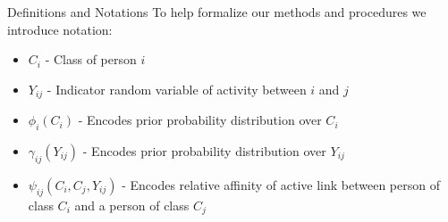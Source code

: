 \message{ !name(poster.tex)}\documentclass[final,t]{beamer}
\begin{document}
\begin{frame}{}
\begin{columns}[t]
\begin{column}{.3\linewidth}
\begin{block}{Definitions and Notations}
        To help formalize our methods and procedures we introduce
        notation: \break
        \begin{itemize}
        \item $C_i$ - Class of person $i$
        \item $Y_{ij}$ - Indicator random variable of activity between $i$ and $j$
        \item $\phi_i(C_i)$ - Encodes prior probability distribution over $C_i$
        \item $\gamma_{ij}(Y_{ij})$ - Encodes prior probability
          distribution over $Y_{ij}$
        \item $\psi_{ij}(C_i,C_j,Y_{ij})$ - Encodes relative affinity
          of active link between person of class $C_i$ and a person of
          class $C_j$
      \end{itemize}
        




      \end{block}




\end{column}
\end{columns}
\end{frame}
\end{document}
